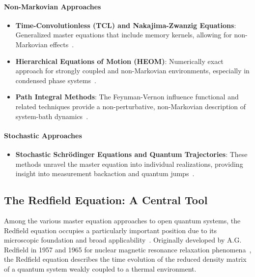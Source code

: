 \paragraph{Non-Markovian Approaches}
\begin{itemize}
	\item \textbf{Time-Convolutionless (TCL) and Nakajima-Zwanzig Equations}: Generalized master equations that include memory kernels, allowing for non-Markovian effects~\cite{breuerpetruccione2009theoryopenquantum, rivas2014quantumnonmarkovianityreview}.
	\item \textbf{Hierarchical Equations of Motion (HEOM)}: Numerically exact approach for strongly coupled and non-Markovian environments, especially in condensed phase systems~\cite{tanimura2020heomreview}.
	\item \textbf{Path Integral Methods}: The Feynman-Vernon influence functional and related techniques provide a non-perturbative, non-Markovian description of system-bath dynamics~\cite{weiss2012quantumdissipativesystems}.
\end{itemize}

\paragraph{Stochastic Approaches}
\begin{itemize}
	\item \textbf{Stochastic Schrödinger Equations and Quantum Trajectories}: These methods unravel the master equation into individual realizations, providing insight into measurement backaction and quantum jumps~\cite{breuerpetruccione2009theoryopenquantum, carmichael1993opensystemsbook}.
\end{itemize}


\subsection{The Redfield Equation: A Central Tool}

Among the various master equation approaches to open quantum systems, the Redfield equation occupies a particularly important position due to its microscopic foundation and broad applicability~\cite{redfield1965theoryrelaxationprocesses, breuerpetruccione2009theoryopenquantum}. Originally developed by A.G. Redfield in 1957 and 1965 for nuclear magnetic resonance relaxation phenomena~\cite{redfield1965theoryrelaxationprocesses}, the Redfield equation describes the time evolution of the reduced density matrix of a quantum system weakly coupled to a thermal environment.


